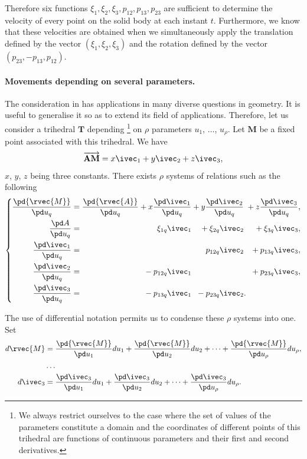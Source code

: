 Therefore six functions $\xi_{1},\xi_{2}, \xi_{3},p_{12},p_{13},p_{23}$ are sufficient to determine the velocity of every point on the solid body at each instant $t$. Furthermore, we know that these velocities are obtained when we simultaneously apply the translation defined by the vector $(\xi_{1},\xi_{2},\xi_{3})$ and the rotation defined by the vector $(p_{23},-p_{13},p_{12})$.

\paragraph{Movements depending on several parameters.}
\label{sec:3}
The consideration in  has applications in many diverse questions in geometry. It is useful to generalise it so as to extend its field of applications. Therefore, let us consider a trihedral $\mathbf{T}$ depending \footnote{We always restrict ourselves to the case where the set of values of the parameters constitute a domain and the coordinates of different points of this trihedral are functions of continuous parameters and their first and second derivatives.} on $\rho$ parameters $u_{1}$, $\dots$, $u_{\rho}$. Let $\mathbf{M}$ be a fixed point associated with this trihedral. We have
\[
\overrightarrow{\mathbf{AM}}=x\ivec_{1}+y\ivec_{2}+z\ivec_{3},
\]
$x$, $y$, $z$ being three constants. There exists $\rho$ systems of relations such as the following
\begin{equation}
  \label{eq:1.3}
  \left\{
    \begin{alignedat}{6}
      \frac{\pd {\rvec{M}}}{\pd u_{q}}&=\frac{\pd {\rvec{A}}}{\pd u_{q}}&{}+x\frac{\pd \ivec_{1}}{\pd u_{q}}&&{}+y\frac{\pd \ivec_{2}}{\pd u_{q}}&&{}+z\frac{\pd \ivec_{3}}{\pd u_{q}},\\
      \frac{\pd A}{\pd u_{q}}&=&{}\xi_{1q}\ivec_{1}&&{}+\xi_{2q}\ivec_{2}&&{}+\xi_{3q}\ivec_{3},\\
      \frac{\pd \ivec_{1}}{\pd u_{q}}&=&&&{}p_{12q}\ivec_{2}&&{}+p_{13q}\ivec_{3},\\
      \frac{\pd \ivec_{2}}{\pd u_{q}}&=&{}-p_{12q}\ivec_{1}&&&&{}+p_{23q}\ivec_{3},\\
      \frac{\pd \ivec_{3}}{\pd u_{q}}&=&{}-p_{13q}\ivec_{1}&&{}-p_{23q}\ivec_{2}&.&
    \end{alignedat}
  \right.
\end{equation}

The use of differential notation permits us to condense these $\rho$ systems into one. Set
\begin{align*}
  d{\rvec{M}}&=\frac{\pd{\rvec{M}}}{\pd u_{1}}du_{1}+\frac{\pd{\rvec{M}}}{\pd u_{2}}du_{2}+\dots+\frac{\pd{\rvec{M}}}{\pd u_{\rho}}du_{\rho},\\
  &\dots\\
  d\ivec_{3}&=\frac{\pd\ivec_{3}}{\pd u_{1}}du_{1}+\frac{\pd \ivec_{3}}{\pd u_{2}}du_{2}+\dots+\frac{\pd \ivec_{3}}{\pd u_{\rho}}du_{\rho}.
\end{align*}

